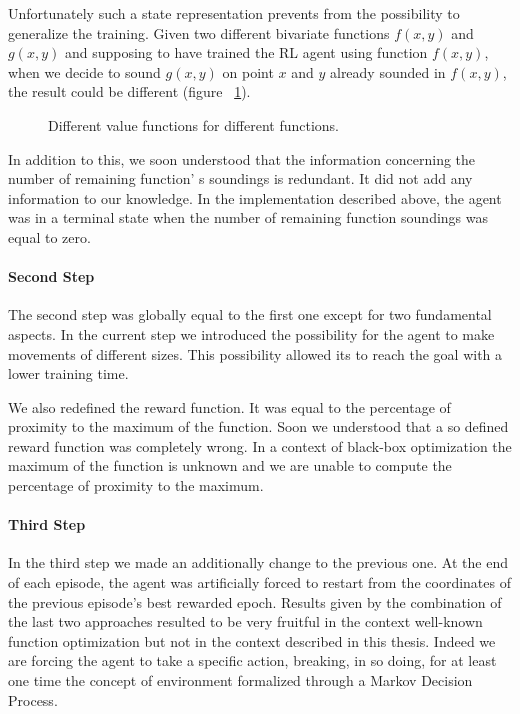 Unfortunately such a state representation prevents from the possibility to generalize the training. Given two different bivariate functions $f(x, y)$ and $g(x, y)$ and supposing to have trained the RL agent using function $f(x, y)$, when we decide to sound $g(x, y)$ on point $x$ and $y$ already sounded in $f(x, y)$, the result could be different (figure ~\ref{fig:ComparisonBetweenTwoFunctions}).

\begin{figure}[h!]
	\begin{center}
		\subfigure[$f(x, y) = 2xy$, \quad $f(1, 1) = 2$]{%
			\label{fig:2xy}
			\texttt{[image: 2xy]}
		}
	\end{center}
	\caption{
		Different value functions for different functions.
	}
	\label{fig:ComparisonBetweenTwoFunctions}
\end{figure}

In addition to this, we soon understood that the information concerning the number of remaining function' s soundings is redundant. It did not add any information to our knowledge. 
In the implementation described above, the agent was in a terminal state when the number of remaining function soundings was equal to zero.

\paragraph{Second Step} The second step was globally equal to the first one except for two fundamental aspects. In the current step we introduced the possibility for the agent to make movements of different sizes. This possibility allowed its to reach the goal with a lower training time. 

We also redefined the reward function. It was equal to the percentage of proximity to the maximum of the function. Soon we understood that a so defined reward function was completely wrong. In a context of black-box optimization the maximum of the function is unknown and we are unable to compute the percentage of proximity to the maximum.

\paragraph{Third Step} In the third step we made an additionally change to the previous one. At the end of each episode, the agent was artificially forced to restart from the coordinates of the previous episode's best rewarded epoch. Results given by the combination of the last two approaches resulted to be very fruitful in the context well-known function optimization but not in the context described in this thesis. Indeed we are forcing the agent to take a specific action, breaking, in so doing, for at least one time the concept of environment formalized through a Markov Decision Process.

